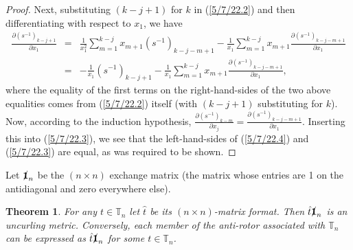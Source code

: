 \documentclass{amsart}
\newtheorem{theorem}{Theorem}
\theoremstyle{definition}
\numberwithin{theorem}{section}
\numberwithin{equation}{section}
\begin{document}
\begin{proof}
Next, substituting $(k-j+1)$ for $k$ in (\ref{5/7/22.2}) and then differentiating with respect to $x_1$, we have   \begin{eqnarray} \nonumber
 \frac{\partial \left( s^{-1} \right)_{k-j+1}}{\partial x_1} &=& \frac{1}{x_1^2} \sum_{m=1}^{k-j} x_{m+1} \left( s^{-1} \right)_{k-j-m+1}    - \frac{1}{x_1} \sum_{m=1}^{k-j} x_{m+1} \frac{\partial \left( s^{-1} \right)_{k-j-m+1}}{\partial x_1}  \\ &=& - \frac{1}{x_1}\left( s^{-1} \right)_{k-j+1}  -  \frac{1}{x_1} \sum_{m=1}^{k-j} x_{m+1} \frac{\partial \left( s^{-1} \right)_{k-j-m+1}}{\partial x_1},\label{5/7/22.3}\end{eqnarray} where the equality of the first terms on the right-hand-sides of the two above equalities comes from (\ref{5/7/22.2}) itself (with $(k-j+1)$ substituting for $k$). 
 Now, according to the induction hypothesis, $\frac{\partial \left( s^{-1} \right)_{k-m}}{\partial x_j} = \frac{\partial \left( s^{-1} \right)_{k-j-m+1}}{\partial x_1}$.  Inserting this into (\ref{5/7/22.3}), we see that the left-hand-sides of (\ref{5/7/22.4}) and (\ref{5/7/22.3}) are equal, as was required to be shown.
 \end{proof} 

Let $\slashed{\bf 1}_n$ be the $(n\times n)$ exchange matrix (the matrix whose entries are 1 on the antidiagonal and zero everywhere else).

\begin{theorem} \label{5/4/22.2} For any $t\in \mathbb{T}_n$ let $\hat{t}$ be its $(n\times n)$-matrix format.    Then $\hat{t} \slashed{\bf 1}_n$ is an uncurling metric.  Conversely, each member of the anti-rotor associated with $\mathbb{T}_n$ can be expressed as $\hat{t}\slashed{\bf 1}_n$ for some $t\in \mathbb{T}_n$.   \end{theorem}
\end{document}
